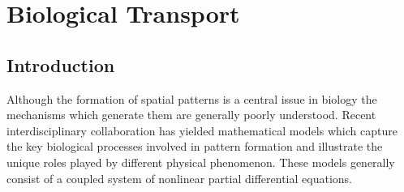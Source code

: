 \chapter{Biological Transport\label{chap:bio}}

\section{Introduction}
Although the formation of spatial patterns is a central issue in biology the mechanisms which generate them are generally poorly understood.  Recent interdisciplinary collaboration has yielded mathematical models which capture the key biological processes involved in pattern formation and illustrate the unique roles played by different physical phenomenon.  These models generally consist of a coupled system of nonlinear partial differential equations.

